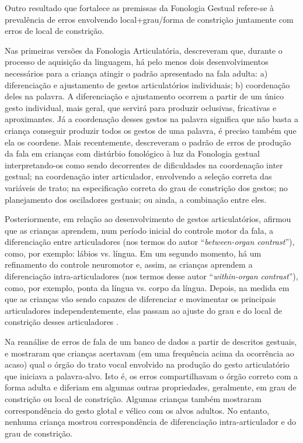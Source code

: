 \documentclass[output=paper,colorlinks,citecolor=brown,booklanguage=portuguese]{langscibook}
\begin{document}
Outro resultado que fortalece as premissas da Fonologia Gestual refere-se à prevalência de erros envolvendo local+grau/forma de constrição juntamente com erros de local de constrição.

Nas primeiras versões da Fonologia Articulatória, \citet{Browman1989} descreveram que, durante o processo de aquisição da linguagem, há pelo menos dois desenvolvimentos necessários para a criança atingir o padrão apresentado na fala adulta: a) diferenciação e ajustamento de gestos articulatórios individuais; b) coordenação deles na palavra. A diferenciação e ajustamento ocorrem a partir de um único gesto individual, mais geral, que servirá para produzir oclusivas, fricativas e aproximantes. Já a coordenação desses gestos na palavra significa que não basta a criança conseguir produzir todos os gestos de uma palavra, é preciso também que ela os coordene. Mais recentemente, \citet[12]{Namasivayam2020} descreveram o padrão de erros de produção da fala em crianças com distúrbio fonológico à luz da Fonologia gestual interpretando-os como sendo decorrentes de dificuldades na coordenação inter gestual; na coordenação inter articulador, envolvendo a seleção correta das variáveis de trato; na especificação correta do grau de constrição dos gestos; no planejamento dos osciladores gestuais; ou ainda, a combinação entre eles.

Posteriormente, em relação ao desenvolvimento de gestos articulatórios, \citet{Goldstein2003} afirmou que as crianças aprendem, num período inicial do controle motor da fala, a diferenciação entre articuladores (nos termos do autor “\emph{between-organ contrast}”), como, por exemplo: lábios vs. língua. Em um segundo momento, há um refinamento do controle neuromotor e, assim, as crianças aprendem a diferenciação intra-articuladores (nos termos desse autor “\emph{within-organ contrast}”), como, por exemplo, ponta da língua vs. corpo da língua. Depois, na medida em que as crianças vão sendo capazes de diferenciar e movimentar os principais articuladores independentemente, elas passam ao ajuste do grau e do local de constrição desses articuladores \citep[86]{Goldstein2003}.

Na reanálise de erros de fala de um banco de dados a partir de descritos gestuais, \citet{StuddertKennedy2002} e \citet{Goldstein2003} mostraram que crianças acertavam (em uma frequência acima da ocorrência ao acaso) qual o órgão do trato vocal envolvido na produção do gesto articulatório que iniciava a palavra-alvo. Isto é, os erros compartilhavam o órgão correto com a forma adulta e diferiam em algumas outras propriedades, geralmente, em grau de constrição ou local de constrição. Algumas crianças também mostraram correspondência do gesto glotal e vélico com os alvos adultos. No entanto, nenhuma criança mostrou correspondência de diferenciação intra-articulador e do grau de constrição.
\end{document}
